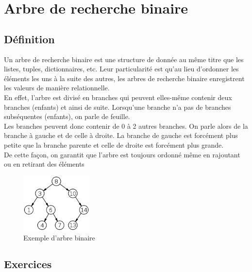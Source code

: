\newpage
\section{Arbre de recherche binaire}
\subsection{Définition}

Un arbre de recherche binaire est une structure de donnée au même titre que les listes, tuples, dictionnaires, etc. Leur particularité est qu'au lieu d'ordonner les éléments les uns à la suite des autres, les arbres de recherche binaire enregistrent les valeurs de manière relationnelle.\\

En effet, l'arbre est divisé en branches qui peuvent elles-même contenir deux branches (enfants) et ainsi de suite. Lorsqu'une branche n'a pas de branches subséquentes (enfants), on parle de feuille.\\

Les branches peuvent donc contenir de 0 à 2 autres branches. On parle alors de la branche à gauche et de celle à droite. La branche de gauche est forcément plus petite que la branche parente et celle de droite est forcément plus grande.\\

De cette façon, on garantit que l'arbre est toujours ordonné même en rajoutant ou en retirant des éléments\\

\begin{figure}[h]
    \centering
    \includegraphics[width=0.32\textwidth]{img/binary-search-tree.png}
    \caption{Exemple d'arbre binaire}
\end{figure}

\subsection{Exercices}

